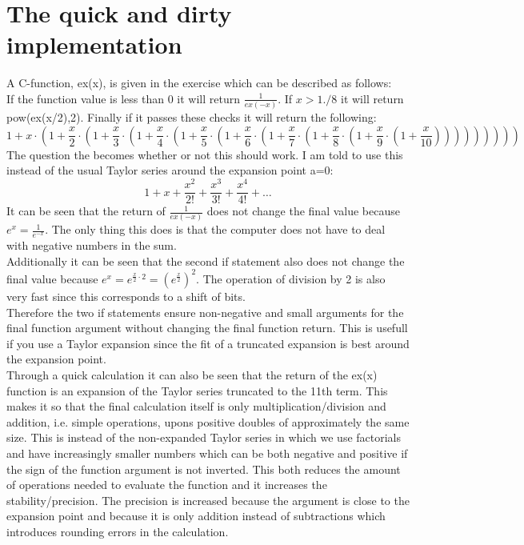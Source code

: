 \documentclass{article}
\begin{document}
\section{The quick and dirty implementation}
A C-function, ex(x), is given in the exercise which can be described as follows:\\
If the function value is less than 0 it will return $\frac{1}{ex(-x)}$. If $x>1./8$ it will return pow(ex(x/2),2). Finally if it passes these checks it will return the following:
\begin{equation}
	1+x\cdot\left(1+\frac{x}{2}\cdot\left(1+\frac{x}{3}\cdot\left(1+\frac{x}{4}\cdot\left(1+\frac{x}{5}\cdot\left(1+\frac{x}{6}\cdot\left(1+\frac{x}{7}\cdot\left(1+\frac{x}{8}\cdot\left(1+\frac{x}{9}\cdot\left(1+\frac{x}{10}\right)\right)\right)\right)\right)\right)\right)\right)\right)
\end{equation}
The question the becomes whether or not this should work. I am told to use this instead of the usual Taylor series around the expansion point a=0:
\begin{equation}
	1+x+\frac{x^2}{2!}+\frac{x^3}{3!}+\frac{x^4}{4!}+\ldots
\end{equation}
It can be seen that the return of $\frac{1}{ex(-x)}$ does not change the final value because $e^x=\frac{1}{e^{-x}}$. The only thing this does is that the computer does not have to deal with negative numbers in the sum.\\
Additionally it can be seen that the second if statement also does not change the final value because $e^x = e^{\frac{x}{2}\cdot 2} = \left(e^{\frac{x}{2}}\right)^2$. The operation of division by 2 is also very fast since this corresponds to a shift of bits.\\
Therefore the two if statements ensure non-negative and small arguments for the final function argument without changing the final function return. This is usefull if you use a Taylor expansion since the fit of a truncated expansion is best around the expansion point.\\
Through a quick calculation it can also be seen that the return of the ex(x) function is an expansion of the Taylor series truncated to the 11th term. This makes it so that the final calculation itself is only multiplication/division and addition, i.e. simple operations, upons positive doubles of approximately the same size. This is instead of the non-expanded Taylor series in which we use factorials and have increasingly smaller numbers which can be both negative and positive if the sign of the function argument is not inverted. This both reduces the amount of operations needed to evaluate the function and it increases the stability/precision. The precision is increased because the argument is close to the expansion point and because it is only addition instead of subtractions which introduces rounding errors in the calculation.\\
\end{document}
